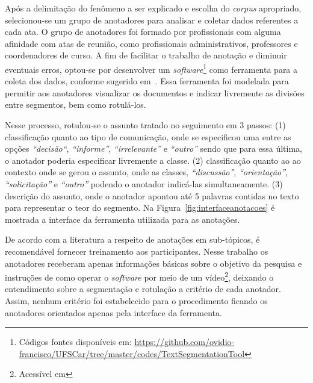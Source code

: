 Após a delimitação do fenômeno a ser explicado e escolha do \textit{corpus} apropriado, selecionou-se um grupo de anotadores para analisar e coletar dados referentes a cada ata. O grupo de anotadores foi formado por profissionais com alguma afinidade com atas de reunião, como profissionais administrativos, professores e coordenadores de curso. 
A fim de facilitar o trabalho de anotação e diminuir eventuais erros, optou-se por desenvolver um \textit{software}\footnote{Códigos fontes disponíveis em: \url{https://github.com/ovidio-francisco/UFSCar/tree/master/codes/TextSegmentationTool} } como ferramenta para a coleta dos dados, conforme sugerido em~\cite{Hovy2010}. Essa ferramenta foi modelada para permitir aos anotadores visualizar os documentos e indicar livremente as divisões entre segmentos, bem como rotulá-los. 

Nesse processo, rotulou-se o assunto tratado no seguimento em 3 passos:
(1) classificação quanto ao tipo de comunicação, onde se especificou uma entre as opções 
\textit{``decisão``},
\textit{``informe''},
\textit{``irrelevante''} e 
\textit{``outro''} sendo que para essa última, o anotador poderia especificar livremente a classe.
(2) classificação quanto ao ao contexto onde se gerou o assunto, onde as classes, 
\textit{``discussão''},
\textit{``orientação''},
\textit{``solicitação''} e 
\textit{``outro''} podendo o anotador indicá-las simultaneamente.
(3) descrição do assunto, onde o anotador apontou até 5 palavras contidas no texto para representar o teor do segmento.
Na Figura~\ref{fig:interfaceanotacoes} é mostrada a interface da ferramenta utilizada para as anotações.

De acordo com a literatura a respeito de anotações em sub-tópicos, é recomendável fornecer treinamento aos participantes. Nesse trabalho os anotadores receberam apenas informações básicas sobre o objetivo da pesquisa e instruções de como operar o \textit{software} por meio de um vídeo\footnote{Acessível em }, deixando o entendimento sobre a segmentação e rotulação a critério de cada anotador. Assim, nenhum critério foi estabelecido para o procedimento ficando os anotadores orientados apenas pela interface da ferramenta. 

